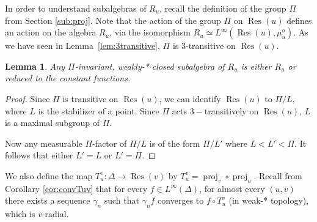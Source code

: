 \documentclass[a4paper, 11pt]{article}
\theoremstyle{plain}
\newtheorem{lemma}[proposition]{Lemma}
\theoremstyle{definition}
\theoremstyle{remark}
\DeclareMathOperator{\proj}{proj}
\DeclareMathOperator{\Res}{Res}
\begin{document}
In order to understand subalgebras of $R_u$, recall the definition of the group $\Pi$ from Section \ref{sub:proj}. 
Note that the action of the group $\Pi$ on $\Res(u)$ defines an action on the algebra $R_u$, via the isomorphism $R_u\simeq L^\infty(\Res(u),\mu_u^o)$. As we have seen in Lemma~\ref{lem:3transitive}, $\Pi$ is 3-transitive on $\Res(u)$.

\begin{lemma}\label{lem:SubalgebraRu}
Any $\Pi$-invariant, weakly-* closed subalgebra of $R_u$ is either $R_u$ or reduced to the constant functions.
\end{lemma}

\begin{proof}
Since $\Pi$ is transitive on $\Res(u)$, we can identify $\Res(u)$ to $\Pi/L$, where $L$ is the stabilizer of a point. Since $\Pi$ acts $3-$transitively on $\Res(u)$, $L$ is a maximal subgroup of $\Pi$.

Now any measurable $\Pi$-factor of $\Pi/L$ is of the form $\Pi/L'$ where $L<L'<\Pi$. It follows that either $L'=L$ or $L'=\Pi$.
\end{proof}

We also define the map $T_u^v:\Delta\to \Res(v)$ by $T_u^v=\proj_v\circ \proj_u$. Recall from Corollary \ref{cor:convTuv} that for every $f\in L^\infty(\Delta)$, for almost every $(u,v)$  there exists a sequence $\gamma_n$ such that $\gamma_n f$ converges to $f\circ T_u^v$ (in weak-* topology), which is $v$-radial.
\end{document}
